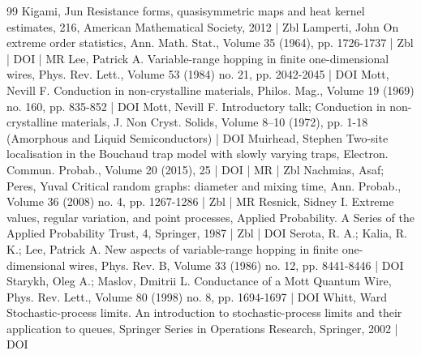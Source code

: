 \documentclass[10pt]{amsart}
\theoremstyle{definition}\newtheorem{defi}[theo]{Definition}\newtheorem{rema}[theo]{Remark}\newtheorem{exam}[theo]{Example}\newtheorem{exem}[theo]{Example}\newtheorem{nota}[theo]{Notation}
\begin{document}
\begin{thebibliography}{99}
 Kigami, Jun Resistance forms, quasisymmetric maps and heat kernel estimates, 216, American Mathematical Society, 2012 | Zbl
 Lamperti, John On extreme order statistics, Ann. Math. Stat., Volume 35 (1964), pp. 1726-1737 | Zbl | DOI | MR
 Lee, Patrick A. Variable-range hopping in finite one-dimensional wires, Phys. Rev. Lett., Volume 53 (1984) no. 21, pp. 2042-2045 | DOI
 Mott, Nevill F. Conduction in non-crystalline materials, Philos. Mag., Volume 19 (1969) no. 160, pp. 835-852 | DOI
 Mott, Nevill F. Introductory talk; Conduction in non-crystalline materials, J. Non Cryst. Solids, Volume 8–10 (1972), pp. 1-18 (Amorphous and Liquid Semiconductors) | DOI
 Muirhead, Stephen Two-site localisation in the Bouchaud trap model with slowly varying traps, Electron. Commun. Probab., Volume 20 (2015), 25 | DOI | MR | Zbl
 Nachmias, Asaf; Peres, Yuval Critical random graphs: diameter and mixing time, Ann. Probab., Volume 36 (2008) no. 4, pp. 1267-1286 | Zbl | MR
 Resnick, Sidney I. Extreme values, regular variation, and point processes, Applied Probability. A Series of the Applied Probability Trust, 4, Springer, 1987 | Zbl | DOI
 Serota, R. A.; Kalia, R. K.; Lee, Patrick A. New aspects of variable-range hopping in finite one-dimensional wires, Phys. Rev. B, Volume 33 (1986) no. 12, pp. 8441-8446 | DOI
 Starykh, Oleg A.; Maslov, Dmitrii L. Conductance of a Mott Quantum Wire, Phys. Rev. Lett., Volume 80 (1998) no. 8, pp. 1694-1697 | DOI
 Whitt, Ward Stochastic-process limits. An introduction to stochastic-process limits and their application to queues, Springer Series in Operations Research, Springer, 2002 | DOI
\end{thebibliography}
\end{document}
